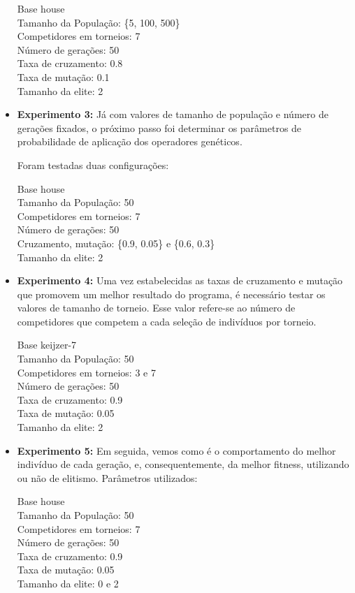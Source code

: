 \documentclass[12pt]{article}
\begin{document}
\begin{itemize}
 Base house \\
 Tamanho da População: \{5, 100, 500\} \\
 Competidores em torneios: 7 \\
 Número de gerações: 50 \\
 Taxa de cruzamento: 0.8 \\
 Taxa de mutação: 0.1 \\
 Tamanho da elite: 2 \\
 
 \item \textbf{Experimento 3:} Já com valores de tamanho de população e número de gerações fixados,
 o próximo passo foi determinar os parâmetros de probabilidade de aplicação dos operadores genéticos.
 
 Foram testadas duas configurações:
 
 Base house \\
 Tamanho da População: 50 \\
 Competidores em torneios: 7 \\
 Número de gerações: 50 \\
 Cruzamento, mutação: \{0.9, 0.05\} e \{0.6, 0.3\} \\
 Tamanho da elite: 2 \\
 
 \item \textbf{Experimento 4:} Uma vez estabelecidas as taxas de cruzamento e mutação que promovem
 um melhor resultado do programa, é necessário testar os valores de tamanho de torneio. Esse valor
 refere-se ao número de competidores que competem a cada seleção de indivíduos por torneio.
 
 Base keijzer-7 \\
 Tamanho da População: 50 \\
 Competidores em torneios: 3 e 7 \\
 Número de gerações: 50 \\
 Taxa de cruzamento: 0.9 \\ 
 Taxa de mutação: 0.05 \\
 Tamanho da elite: 2 \\
 
 \item \textbf{Experimento 5:} Em seguida, vemos como é o comportamento do melhor indivíduo de
 cada geração, e, consequentemente, da melhor fitness, utilizando ou não de elitismo. Parâmetros
 utilizados:
 
 Base house \\
 Tamanho da População: 50 \\
 Competidores em torneios: 7 \\
 Número de gerações: 50 \\
 Taxa de cruzamento: 0.9 \\ 
 Taxa de mutação: 0.05 \\
 Tamanho da elite: 0 e 2 \\
 

\end{itemize}
\end{document}
